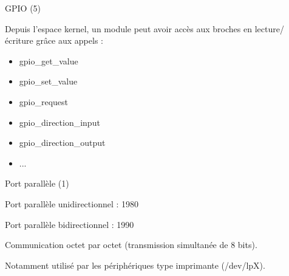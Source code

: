 \documentclass[12pt, t]{beamer}
\newcommand{\bi}{\begin{itemize}}
\newcommand{\ei}{\end{itemize}}
\begin{document}
\begin{frame}{GPIO (5)}

    \vspace{15pt}
    Depuis l'espace kernel, un module peut avoir accès aux broches en
    lecture/écriture grâce aux appels :

    \vspace{10pt}
    \bi
    \itemsep8pt
    \item gpio\_get\_value
    \item gpio\_set\_value
    \item gpio\_request
    \item gpio\_direction\_input
    \item gpio\_direction\_output
    \item ...
    \ei

\end{frame}

\begin{frame}{Port parallèle (1)}

    \vspace{20pt}
    Port parallèle unidirectionnel : 1980

    \vspace{20pt}
    Port parallèle bidirectionnel : 1990

    \vspace{20pt}
    Communication octet par octet (transmission simultanée de 8 bits).

    \vspace{20pt}
    Notamment utilisé par les périphériques type imprimante (/dev/lpX).

\end{frame}
\end{document}
